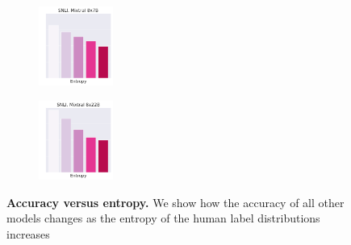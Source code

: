 \begin{figure}[t]
\begin{subfigure}[b]{0.2\textwidth}
        \caption{}
    \end{subfigure}
    \begin{subfigure}[b]{0.2\textwidth}
        \includegraphics[height=2.6cm]{figures/appendix/entropy_acc_snli_8x7B}
        \caption{}
    \end{subfigure}
    \begin{subfigure}[b]{0.2\textwidth}
        \includegraphics[height=2.6cm]{figures/appendix/entropy_acc_snli_8x22B}
        \caption{}
    \end{subfigure}
    \caption{\textbf{Accuracy versus entropy.} We show how the accuracy of all other models changes as the entropy of the human label distributions increases}
    \label{fig:entropy_accuracy_all}
\end{figure}